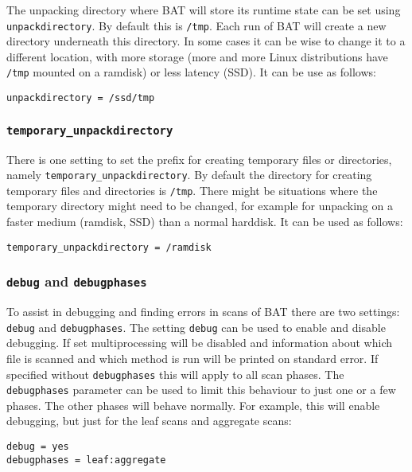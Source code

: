 \documentclass[10pt,a4paper]{article}
\begin{document}
The unpacking directory where BAT will store its runtime state can be set using
\texttt{unpackdirectory}. By default this is \texttt{/tmp}. Each run of BAT
will create a new directory underneath this directory. In some cases it can be
wise to change it to a different location, with more storage (more and more
Linux distributions have \texttt{/tmp} mounted on a ramdisk) or less latency
(SSD). It can be use as follows:

\begin{verbatim}
unpackdirectory = /ssd/tmp
\end{verbatim}

\subsubsection{\texttt{temporary\_unpackdirectory}}

There is one setting to set the prefix for creating temporary files or
directories, namely \texttt{temporary\_unpackdirectory}. By default the
directory for creating temporary files and directories is \texttt{/tmp}. There
might be situations where the temporary directory might need to be changed, for
example for unpacking on a faster medium (ramdisk, SSD) than a normal harddisk.
It can be used as follows:

\begin{verbatim}
temporary_unpackdirectory = /ramdisk
\end{verbatim}

\subsubsection{\texttt{debug} and \texttt{debugphases}}

To assist in debugging and finding errors in scans of BAT there are two
settings: \texttt{debug} and \texttt{debugphases}. The setting \texttt{debug}
can be used to enable and disable debugging. If set multiprocessing will be
disabled and information about which file is scanned and which method is run
will be printed on standard error. If specified without \texttt{debugphases}
this will apply to all scan phases. The \texttt{debugphases} parameter can be
used to limit this behaviour to just one or a few phases. The other phases will
behave normally. For example, this will enable debugging, but just for the
leaf scans and aggregate scans:

\begin{verbatim}
debug = yes
debugphases = leaf:aggregate
\end{verbatim}
\end{document}
